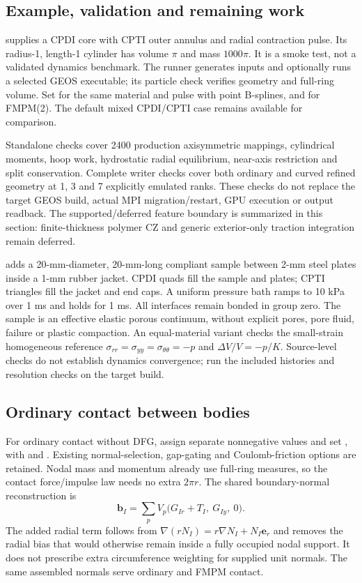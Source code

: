 \subsection{Example, validation and remaining work}
 supplies a CPDI core with CPTI outer
annulus and radial contraction pulse. Its radius-1, length-1 cylinder has
volume $\pi$ and mass $1000\pi$. It is a smoke test, not a validated dynamics
benchmark. The runner generates inputs and optionally runs a selected GEOS
executable; its particle check verifies geometry and full-ring volume.
Set  for the same material and
pulse with point B-splines, and  for FMPM(2).
The default mixed CPDI/CPTI case remains available for comparison.

Standalone checks cover 2400 production axisymmetric mappings, cylindrical
moments, hoop work, hydrostatic radial equilibrium, near-axis restriction and
split conservation. Complete writer checks cover both ordinary and curved
refined geometry at 1, 3 and 7 explicitly emulated ranks. These checks do not
replace the target GEOS build, actual MPI migration/restart, GPU execution or
output readback. The supported/deferred feature boundary is summarized in this section: finite-thickness polymer CZ and generic exterior-only traction integration remain deferred.

 adds a 20-mm-diameter, 20-mm-long
compliant sample between 2-mm steel plates inside a 1-mm rubber jacket.
CPDI quads fill the sample and plates; CPTI triangles fill the jacket and end
caps. A uniform pressure bath ramps to 10 kPa over 1 ms and holds for 1 ms.
All interfaces remain bonded in group zero. The sample is an effective elastic
porous continuum, without explicit pores, pore fluid, failure or plastic
compaction. An equal-material variant checks the small-strain homogeneous
reference $\sigma_{rr}=\sigma_{yy}=\sigma_{\theta\theta}=-p$ and
$\Delta V/V=-p/K$. Source-level checks do not establish dynamics convergence;
run the included histories and resolution checks on the target build.


\subsection{Ordinary contact between bodies}
For ordinary contact without DFG, assign separate nonnegative
 values and set
, with  and
. Existing normal-selection, gap-gating and
Coulomb-friction options are retained. Nodal mass and momentum already use
full-ring measures, so the contact force/impulse law needs no extra $2\pi r$.
The shared boundary-normal reconstruction is
\[
 \boldsymbol b_I=\sum_p V_p\bigl(G_{Ir}+T_I,\ G_{Iy},\ 0\bigr).
\]
The added radial term follows from
$\nabla(rN_I)=r\nabla N_I+N_I\boldsymbol e_r$ and removes the radial bias
that would otherwise remain inside a fully occupied nodal support. It does
not prescribe extra circumference weighting for supplied unit normals.
The same assembled normals serve ordinary and FMPM contact.

